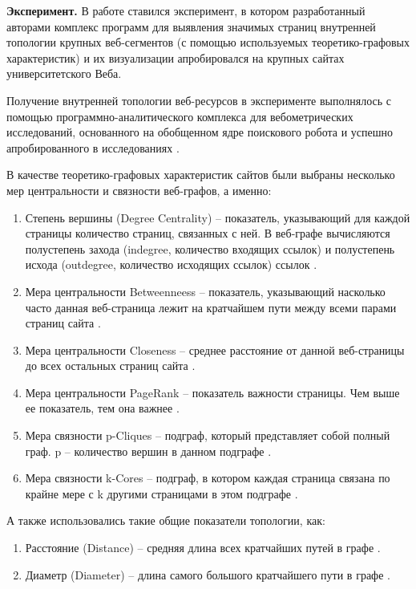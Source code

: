 \textbf{Эксперимент.} В работе ставился эксперимент, в котором разработанный авторами комплекс программ для выявления значимых страниц внутренней топологии крупных веб-сегментов (с помощью используемых теоретико-графовых характеристик) и их визуализации апробировался на крупных сайтах университетского Веба. 

Получение внутренней топологии веб-ресурсов в эксперименте выполнялось с помощью программно-аналитического комплекса для вебометрических исследований, основанного на обобщенном ядре поискового робота \cite{BlekanovSergeevMartynenko} и успешно апробированного в исследованиях \cite{BlekanovSergeevMaksimov,MaksimovBlekanov,BlekanovSergeevMaksimovBOWTIE}.

В качестве теоретико-графовых характеристик сайтов были выбраны несколько мер центральности и связности веб-графов, а именно:
\begin{enumerate}
	\item Степень вершины (Degree Centrality) -- показатель, указывающий для каждой страницы количество страниц, связанных с ней. В веб-графе вычисляются полустепень захода (indegree, количество входящих ссылок) и полустепень исхода (outdegree, количество исходящих ссылок) ссылок \cite{WassermanFaust,OrtegaAguillo}.
		\item Мера центральности Betweenneess -- показатель, указывающий насколько часто данная веб-страница лежит на кратчайшем пути между всеми парами страниц сайта \cite{WassermanFaust,OrtegaAguillo}.
		\item Мера центральности Closeness -- среднее расстояние от данной веб-страницы до всех остальных страниц сайта \cite{WassermanFaust}.
		\item Мера центральности PageRank -- показатель важности страницы. Чем выше ее показатель, тем она важнее \cite{PageBrinMotwani}.
		\item Мера связности p-Cliques -- подграф, который представляет собой полный граф. p -- количество вершин в данном подграфе \cite{OrtegaAguillo}.
		\item Мера связности k-Cores -- подграф, в котором каждая страница связана по крайне мере с k другими страницами в этом подграфе \cite{OrtegaAguillo}.
\end{enumerate}

А также использовались такие общие показатели топологии, как:
\begin{enumerate}
	\item Расстояние (Distance) -- средняя длина всех кратчайших путей в графе \cite{MaksimovBlekanov}. 
	\item Диаметр (Diameter) -- длина самого большого кратчайшего пути в графе \cite{MaksimovBlekanov}.
\end{enumerate}

